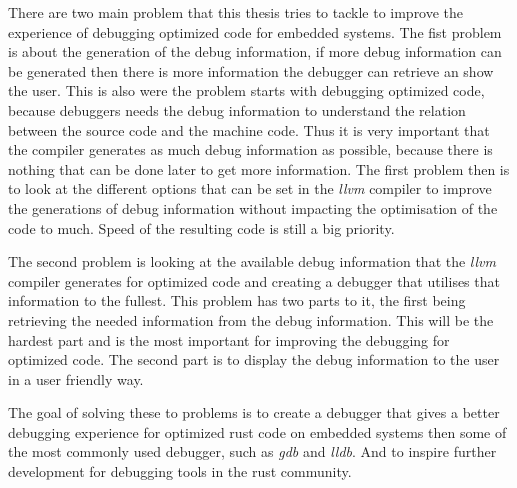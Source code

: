  


There are two main problem that this thesis tries to tackle to improve the experience of debugging optimized code for embedded systems.
The fist problem is about the generation of the debug information, if more debug information can be generated then there is more information the debugger can retrieve an show the user.
This is also were the problem starts with debugging optimized code, because debuggers needs the debug information to understand the relation between the source code and the machine code.
Thus it is very important that the compiler generates as much debug information as possible, because there is nothing that can be done later to get more information.
The first problem then is to look at the different options that can be set in the \emph{llvm} compiler to improve the generations of debug information without impacting the optimisation of the code to much.
Speed of the resulting code is still a big priority.


The second problem is looking at the available debug information that the \emph{llvm} compiler generates for optimized code and creating a debugger that utilises that information to the fullest.
This problem has two parts to it, the first being retrieving the needed information from the debug information.
This will be the hardest part and is the most important for improving the debugging for optimized code.
The second part is to display the debug information to the user in a user friendly way.


The goal of solving these to problems is to create a debugger that gives a better debugging experience for optimized rust code on embedded systems then some of the most commonly used debugger, such as \emph{gdb} and \emph{lldb}.
And to inspire further development for debugging tools in the rust community.

